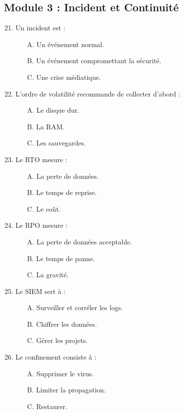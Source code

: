 \subsection*{Module 3 : Incident et Continuité}
\begin{enumerate}
    \setcounter{enumi}{20}
    \item Un incident est :
    \begin{itemize} \item[A.] Un événement normal. \item[B.] Un événement compromettant la sécurité. \item[C.] Une crise médiatique. \end{itemize}
    \item L'ordre de volatilité recommande de collecter d'abord :
    \begin{itemize} \item[A.] Le disque dur. \item[B.] La RAM. \item[C.] Les sauvegardes. \end{itemize}
    \item Le RTO mesure :
    \begin{itemize} \item[A.] La perte de données. \item[B.] Le temps de reprise. \item[C.] Le coût. \end{itemize}
    \item Le RPO mesure :
    \begin{itemize} \item[A.] La perte de données acceptable. \item[B.] Le temps de panne. \item[C.] La gravité. \end{itemize}
    \item Le SIEM sert à :
    \begin{itemize} \item[A.] Surveiller et corréler les logs. \item[B.] Chiffrer les données. \item[C.] Gérer les projets. \end{itemize}
    \item Le confinement consiste à :
    \begin{itemize} \item[A.] Supprimer le virus. \item[B.] Limiter la propagation. \item[C.] Restaurer. \end{itemize}

\end{enumerate}
